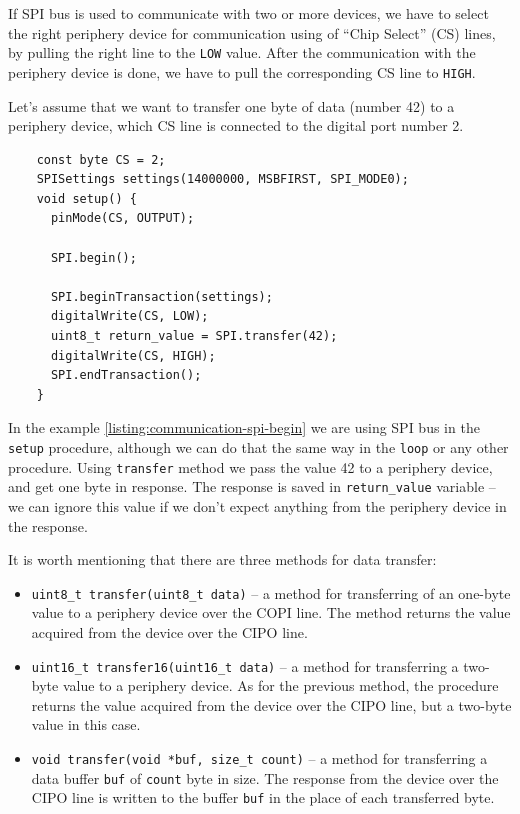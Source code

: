 \documentclass[../sparc.tex]{subfiles}
\begin{document}
If SPI bus is used to communicate with two or more devices, we have to select
the right periphery device for communication using of ``Chip Select'' (CS)
lines, by pulling the right line to the \texttt{LOW} value.  After the
communication with the periphery device is done, we have to pull the
corresponding CS line to \texttt{HIGH}.

Let's assume that we want to transfer one byte of data (number 42) to a
periphery device, which CS line is connected to the digital port number 2.

\begin{listing}[H]
  \begin{verbatim}
    const byte CS = 2;
    SPISettings settings(14000000, MSBFIRST, SPI_MODE0);
    void setup() {
      pinMode(CS, OUTPUT);

      SPI.begin();

      SPI.beginTransaction(settings);
      digitalWrite(CS, LOW);
      uint8_t return_value = SPI.transfer(42);
      digitalWrite(CS, HIGH);
      SPI.endTransaction();
    }
  \end{verbatim}
  \label{listing:communication-spi-begin}
  \caption{An example of working with the SPI bus.}
\end{listing}

In the example \ref{listing:communication-spi-begin} we are using SPI bus in the
\texttt{setup} procedure, although we can do that the same way in the
\texttt{loop} or any other procedure.  Using \texttt{transfer}
method we pass the value 42 to a periphery device, and get one byte in response.
The response is saved in \texttt{return_value} variable -- we can ignore
this value if we don't expect anything from the periphery device in the
response.

It is worth mentioning that there are three methods for data transfer:

\begin{itemize}
\item \texttt{uint8_t transfer(uint8_t data)} -- a method for
  transferring of an one-byte value to a periphery device over the COPI line.
  The method returns the value acquired from the device over the CIPO line.
\item \texttt{uint16_t transfer16(uint16_t data)} -- a method for
  transferring a two-byte value to a periphery device.  As for the previous
  method, the procedure returns the value acquired from the device over the CIPO
  line, but a two-byte value in this case.
\item \texttt{void transfer(void *buf, size_t count)} -- a method for
  transferring a data buffer \texttt{buf} of \texttt{count}
  byte in size.  The response from the device over the CIPO line is written to
  the buffer \texttt{buf} in the place of each transferred byte.
\end{itemize}
\end{document}
